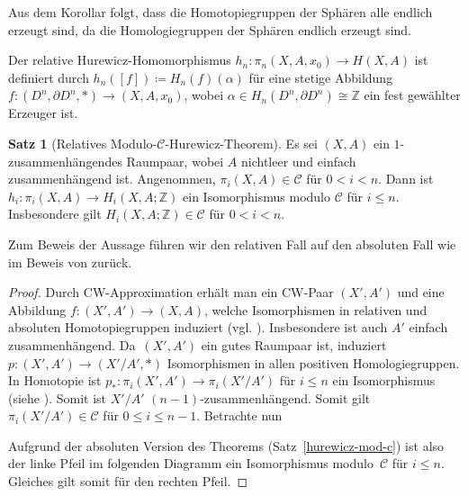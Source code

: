 \documentclass[11pt, a4paper, german]{article}
\theoremstyle{definition}
\newtheorem{satz}[lem]{Satz}
\theoremstyle{remark}
\newcommand{\Z}{\mathbb{Z}} %
\newcommand{\SC}{\mathcal{C}} %
\begin{document}
Aus dem Korollar folgt, dass die Homotopiegruppen der Sphären alle endlich erzeugt sind, da die Homologiegruppen der Sphären endlich erzeugt sind.

Der relative Hurewicz-Homomorphismus $h_n : \pi_n(X, A, x_0) \to H(X, A)$ ist definiert durch $h_n([f]) \coloneqq H_n(f)(\alpha)$ für eine stetige Abbildung $f : (D^n, \partial D^n, *) \to (X, A, x_0)$, wobei $\alpha \in H_n(D^n, \partial D^n) \cong \Z$ ein fest gewählter Erzeuger ist.

\begin{satz}[Relatives Modulo-$\SC$-Hurewicz-Theorem]\label{relative-hurewicz-mod-c}
  Es sei $(X, A)$ ein $1$-zusammenhängendes Raumpaar, wobei $A$ nichtleer und einfach zusammenhängend ist.
  Angenommen, $\pi_i(X, A) \in \SC$ für $0 < i < n$.
  Dann ist $h_i : \pi_i(X, A) \to H_i(X, A; \Z)$ ein Isomorphismus modulo $\SC$ für $i \leq n$.
  Insbesondere gilt $H_i(X, A; \Z) \in \SC$ für $0 < i < n$.
\end{satz}

Zum Beweis der Aussage führen wir den relativen Fall auf den absoluten Fall wie im Beweis von \cite[Thm 4.32]{hatcher:at} zurück.

\begin{proof}
  Durch CW-Approximation erhält man ein CW-Paar $(X', A')$ und eine Abbildung ${f : (X', A') \to (X, A)}$, welche Isomorphismen in relativen und absoluten Homotopiegruppen induziert (vgl. \cite[Bsp 4.14]{hatcher:at}).
  Insbesondere ist auch $A'$ einfach zusammenhängend.
  Da~$(X', A')$ ein gutes Raumpaar ist, induziert $p : (X', A') \to (X'/A', *)$ Isomorphismen in allen positiven Homologiegruppen.
  In Homotopie ist $p_* : \pi_i(X', A') \to \pi_i(X'/A')$ für $i \leq n$ ein Isomorphismus (siehe \cite[Prop 4.28]{hatcher:at}).
  Somit ist $X'/A'$ $(n {-} 1)$-zusammenhängend.
  Somit gilt $\pi_i(X'/A') \in \SC$ für $0 \leq i \leq n-1$.
  Betrachte nun
  \begin{center}
  \end{center}
  Aufgrund der absoluten Version des Theorems (Satz~\ref{hurewicz-mod-c}) ist also der linke Pfeil im folgenden Diagramm ein Isomorphismus modulo~$\SC$ für $i \leq n$.
  Gleiches gilt somit für den rechten Pfeil.
\end{proof}
\end{document}
